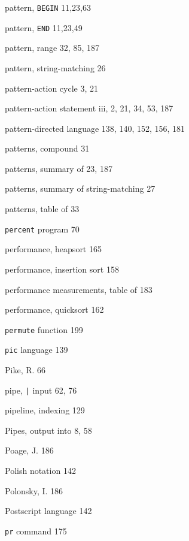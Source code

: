 \begin{multicols}{3}
\hangindent=3pc  pattern, \verb'BEGIN' 11,23,63

\hangindent=3pc  pattern, \verb'END' 11,23,49

\hangindent=3pc  pattern, range 32, 85, 187

\hangindent=3pc  pattern, string-matching 26

\hangindent=3pc  pattern-action cycle 3, 21

\hangindent=3pc  pattern-action statement iii, 2, 21, 34, 53, 187

\hangindent=3pc  pattern-directed language 138,  140, 152, 156, 181

\hangindent=3pc  patterns, compound 31

\hangindent=3pc  patterns, summary of 23, 187

\hangindent=3pc  patterns, summary of string-matching 27

\hangindent=3pc  patterns, table of 33

\hangindent=3pc  \verb'percent' program 70

\hangindent=3pc  performance, heapsort 165

\hangindent=3pc  performance, insertion sort 158

\hangindent=3pc  performance measurements, table of 183

\hangindent=3pc  performance, quicksort 162

\hangindent=3pc  \verb'permute' function 199

\hangindent=3pc  \verb'pic' language 139

\hangindent=3pc  Pike, R. 66

\hangindent=3pc  pipe, \verb'|' input 62, 76

\hangindent=3pc  pipeline, indexing 129

\hangindent=3pc  Pipes, output into 8, 58

\hangindent=3pc  Poage, J. 186

\hangindent=3pc  Polish notation 142

\hangindent=3pc  Polonsky, I. 186

\hangindent=3pc  Postscript language 142

\hangindent=3pc  \verb'pr' command 175


\end{multicols}
